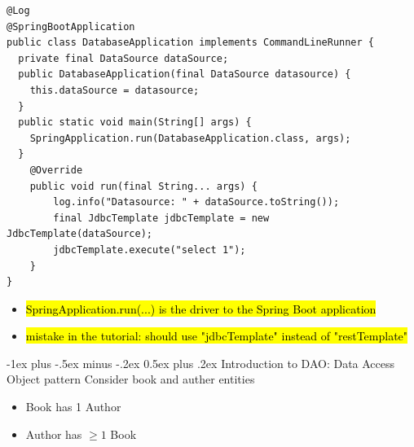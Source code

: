 \documentclass[10pt, landscape]{article}
\makeatletter
\renewcommand{\section}{\@startsection{section}{1}{0mm}%
  {-1ex plus -.5ex minus -.2ex}%
  {0.5ex plus .2ex}%
{\normalfont\large\bfseries}}
\makeatother
\begin{document}
\begin{multicols*}{2}
\begin{itemize}
\begin{verbatim}
@Log
@SpringBootApplication
public class DatabaseApplication implements CommandLineRunner {
  private final DataSource dataSource;
  public DatabaseApplication(final DataSource datasource) {
    this.dataSource = datasource;
  }
  public static void main(String[] args) {
    SpringApplication.run(DatabaseApplication.class, args);
  }
	@Override
	public void run(final String... args) {
		log.info("Datasource: " + dataSource.toString());
		final JdbcTemplate jdbcTemplate = new JdbcTemplate(dataSource);
		jdbcTemplate.execute("select 1");
	}
}
\end{verbatim}
  \begin{itemize}
    \item \hl{SpringApplication.run(...) is the driver to the Spring Boot application}
    \item \hl{mistake in the tutorial: should use "jdbcTemplate" instead of "restTemplate"}
  \end{itemize}


  \section{Introduction to DAO: Data Access Object pattern}
  Consider book and auther entities
  \begin{itemize}
    \item Book has 1 Author
    \item Author has $\ge 1$ Book
  \end{itemize}


\end{itemize}
\end{multicols*}
\end{document}
